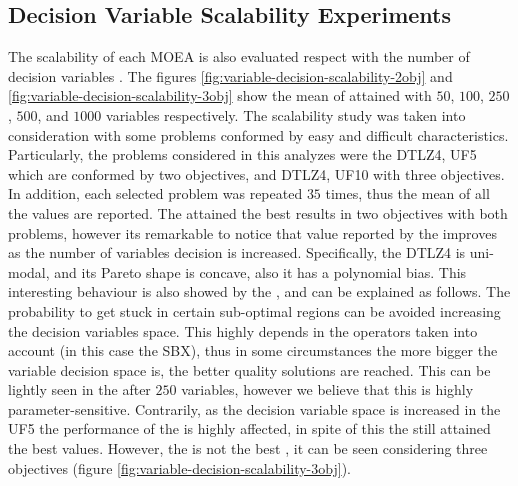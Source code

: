 %
%
%

\subsection{Decision Variable Scalability Experiments}

 
The scalability of each MOEA is also evaluated respect with the number of decision variables \cite{Joel:ScalabilityStudy}. 
%
The figures \ref{fig:variable-decision-scalability-2obj} and \ref{fig:variable-decision-scalability-3obj} show the mean of \HV{} attained with $50$, $100$, $250$, $500$, and $1000$ variables respectively.
%
The scalability study was taken into consideration with some problems conformed by easy and difficult characteristics.
%
Particularly, the problems considered in this analyzes were the DTLZ4, UF5 which are conformed by two objectives, and DTLZ4, UF10 with three objectives.
%
In addition, each selected problem was repeated $35$ times, thus the mean of all the \HV{} values are reported.
%
The \VSDMOEA{} attained the best results in two objectives with both problems, however its remarkable to notice that \HV{} value reported by the \NSGAII{} improves as the number of variables decision is increased.
%
Specifically, the DTLZ4 is uni-modal, and its Pareto shape is concave, also it has a polynomial bias.
%
This interesting behaviour is also showed by the \RMOEA{}, and can be explained as follows.
%
The probability to get stuck in certain sub-optimal regions can be avoided increasing the decision variables space.
%
This highly depends in the operators taken into account (in this case the SBX), thus in some circumstances the more bigger the variable decision space is, the better quality solutions are reached.
%
This can be lightly seen in the \MOEAD{} after $250$ variables, however we believe that this \MOEA{} is highly parameter-sensitive.
%
Contrarily, as the decision variable space is increased in the UF5 the performance of the \MOEAS{} is highly affected, in spite of this the \VSDMOEA{} still attained the best \HV{} values.
%
However, the \VSDMOEA{} is not the best \MOEA{}, it can be seen considering three objectives (figure \ref{fig:variable-decision-scalability-3obj}).
